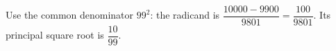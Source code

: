 Use the common denominator $99^2$: the radicand is $\dfrac{10000-9900}{9801}=\dfrac{100}{9801}$. Its principal square root is $\boxed{\dfrac{10}{99}}$.
